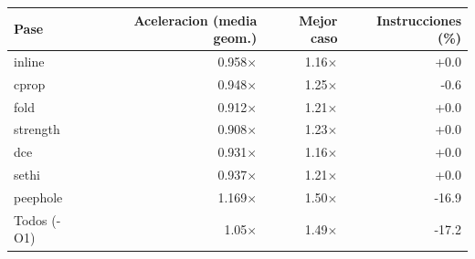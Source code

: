 \begin{tabular}{lrrr}\toprule
Pase & Aceleracion (media geom.) & Mejor caso & Instrucciones (\%) \\\midrule
inline & 0.958$\times$ & 1.16$\times$ & +0.0 \\
cprop & 0.948$\times$ & 1.25$\times$ & -0.6 \\
fold & 0.912$\times$ & 1.21$\times$ & +0.0 \\
strength & 0.908$\times$ & 1.23$\times$ & +0.0 \\
dce & 0.931$\times$ & 1.16$\times$ & +0.0 \\
sethi & 0.937$\times$ & 1.21$\times$ & +0.0 \\
peephole & 1.169$\times$ & 1.50$\times$ & -16.9 \\
\midrule
Todos (-O1) & 1.05$\times$ & 1.49$\times$ & -17.2 \\
\bottomrule\end{tabular}
